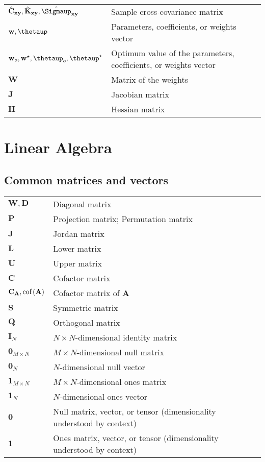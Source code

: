 \documentclass{article}
\newcommand{\cof}[1]{\ensuremath{\textnormal{cof}\left(#1\right)}} %
\begin{document}
\begin{xltabular}{\textwidth}{XX}
    \(\hat{\mathbf{C}}_{\mathbf{xy}}, \hat{\mathbf{K}}_{\mathbf{xy}}, \hat{\boldsymbol{\Sigmaup}}_{\mathbf{xy}}\) & Sample cross-covariance matrix \\
    \(\mathbf{w}, \boldsymbol{\thetaup}\) & Parameters, coefficients, or weights vector \\
    \(\mathbf{w}_o, \mathbf{w}^{\star}, \boldsymbol{\thetaup}_o, \boldsymbol{\thetaup}^{\star}\) & Optimum value of the parameters, coefficients, or weights vector \\
    \(\mathbf{W}\) & Matrix of the weights \\
    \(\mathbf{J}\) & Jacobian matrix\\
    \(\mathbf{H}\) & Hessian matrix
\end{xltabular}

\section{Linear Algebra}
\subsection{Common matrices and vectors}
\begin{xltabular}{\textwidth}{XX}
    \(\mathbf{W}, \mathbf{D}\) & Diagonal matrix \\
    \(\mathbf{P}\) & Projection matrix; Permutation matrix \\
    \(\mathbf{J}\) & Jordan matrix \\
    \(\mathbf{L}\) & Lower matrix\\
    \(\mathbf{U}\) & Upper matrix\\
    \(\mathbf{C}\) & Cofactor matrix\\
    \(\mathbf{C}_\mathbf{A}, \cof{\mathbf{A}}\) & Cofactor matrix of \(\mathbf{A}\)\\
    \(\mathbf{S}\) & Symmetric matrix\\
    \(\mathbf{Q}\) & Orthogonal matrix\\
    \(\mathbf{I}_N\) & \(N\times N\)-dimensional identity matrix\\
    \(\mathbf{0}_{M\times N}\) & \(M\times N\)-dimensional null matrix\\
    \(\mathbf{0}_{N}\) & \(N\)-dimensional null vector\\
    \(\mathbf{1}_{M\times N}\) & \(M\times N\)-dimensional ones matrix\\
    \(\mathbf{1}_{N}\) & \(N\)-dimensional ones vector\\
    \(\mathbf{0}\) & Null matrix, vector, or tensor (dimensionality understood by context)\\
    \(\mathbf{1}\) & Ones matrix, vector, or tensor (dimensionality understood by context)\\
\end{xltabular}
\end{document}
